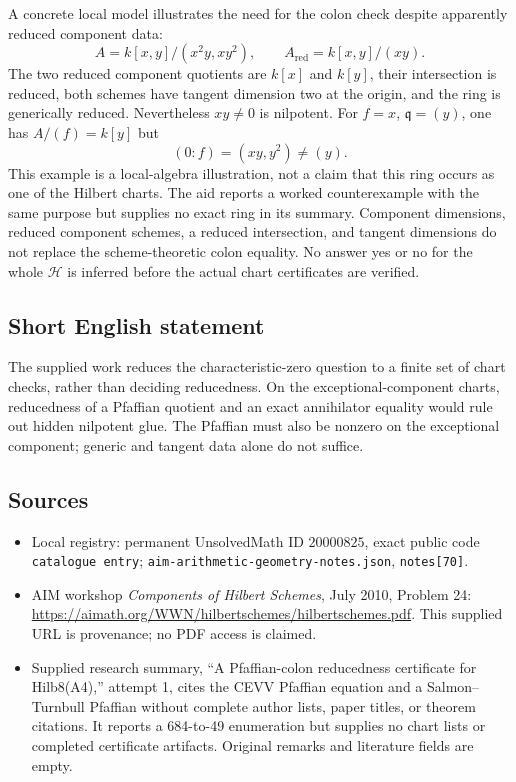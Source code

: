\documentclass[11pt]{article}
\begin{document}
A concrete local model illustrates the need for the colon check despite apparently reduced component data:
\[
 A=k[x,y]/(x^2y,xy^2),\qquad A_{\mathrm{red}}=k[x,y]/(xy).
\]
The two reduced component quotients are \(k[x]\) and \(k[y]\), their intersection is reduced, both schemes have tangent dimension two at the origin, and the ring is generically reduced. Nevertheless \(xy\neq0\) is nilpotent. For \(f=x\), \(\mathfrak q=(y)\), one has \(A/(f)=k[y]\) but
\[
 (0:f)=(xy,y^2)\neq(y).
\]
This example is a local-algebra illustration, not a claim that this ring occurs as one of the Hilbert charts. The aid reports a worked counterexample with the same purpose but supplies no exact ring in its summary. Component dimensions, reduced component schemes, a reduced intersection, and tangent dimensions do not replace the scheme-theoretic colon equality. No answer yes or no for the whole \(\mathcal H\) is inferred before the actual chart certificates are verified.
\subsection{Short English statement}
The supplied work reduces the characteristic-zero question to a finite set of chart checks, rather than deciding reducedness. On the exceptional-component charts, reducedness of a Pfaffian quotient and an exact annihilator equality would rule out hidden nilpotent glue. The Pfaffian must also be nonzero on the exceptional component; generic and tangent data alone do not suffice.
\subsection{Sources}
\begin{itemize}
\item Local registry: permanent UnsolvedMath ID \(20000825\), exact public code \texttt{catalogue entry}; \texttt{aim-arithmetic-geometry-notes.json}, \texttt{notes[70]}.
\item AIM workshop \emph{Components of Hilbert Schemes}, July 2010, Problem 24: \url{https://aimath.org/WWN/hilbertschemes/hilbertschemes.pdf}. This supplied URL is provenance; no PDF access is claimed.
\item Supplied research summary, ``A Pfaffian-colon reducedness certificate for Hilb8(A4),'' attempt 1, cites the CEVV Pfaffian equation and a Salmon--Turnbull Pfaffian without complete author lists, paper titles, or theorem citations. It reports a 684-to-49 enumeration but supplies no chart lists or completed certificate artifacts. Original remarks and literature fields are empty.
\end{itemize}
\end{document}

